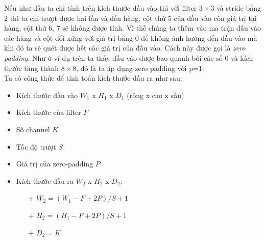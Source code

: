 Nếu như đầu ta chỉ tính trên kích thước đầu vào thì với filter $3\times 3$ và stride bằng 2 thì ta chỉ trượt được hai lần và đến hàng, cột thứ 5 của đầu vào còn giá trị tại hàng, cột thứ 6, 7 sẽ không được tính. Vì thế chúng ta thêm vào ma trận đầu vào các hàng và cột đối xứng với giá trị bằng 0 để không ảnh hưởng đến đầu vào mà khi đó ta sẽ quét được hết các giá trị của đầu vào. Cách này được gọi là \textit{zero padding}. Như ở ví dụ trên ta thấy đầu vào được bao quanh bởi các số 0 và kích thước tăng thành $8 \times 8$, đó là ta áp dụng zero padding với p=1.\\
Ta có công thức để tính toán kích thước đầu ra như sau:
\begin{itemize}
	\item Kích thước đầu vào \textbf{$W_1$} x \textbf{$H_1$} x \textbf{$D_1$} (rộng x cao x sâu)
	\item Kích thước của filter \textbf{$F$}
	\item Số channel \textbf{$K$}
	\item Tốc độ trượt \textbf{$S$}
	\item Giá trị của zero-padding \textbf{$P$}
	\item Kích thước đầu ra \textbf{$W_2$} x \textbf{$H_2$} x \textbf{$D_2$}:
	\begin{itemize}
		\item[+]  \textbf{$W_2 = (W_1 - F+ 2P)/S +1$}
		\item[+] \textbf{$H_2 = (H_1 - F+ 2P)/S +1$}
		\item[+] \textbf{$D_2 = K$}
	\end{itemize}	 
\end{itemize}	

